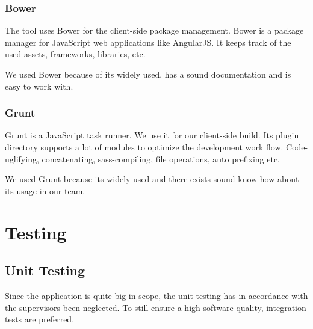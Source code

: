 \subsubsection{Bower}
The tool uses Bower for the client-side package management. Bower is a package manager for JavaScript web applications like AngularJS. It keeps track of the used assets, frameworks, libraries, etc. \cite{bower} \par
We used Bower because of its widely used, has a sound documentation and is easy to work with.

\subsubsection{Grunt}
Grunt is a JavaScript task runner. We use it for our client-side build. Its plugin directory supports a lot of modules to optimize the development work flow. Code-uglifying, concatenating, sass-compiling, file operations, auto prefixing etc. \cite{grunt} \par
We used Grunt because its widely used and there exists sound know how about its usage in our team.



\section{Testing}

\subsection{Unit Testing}
Since the application is quite big in scope, the unit testing has in accordance with the supervisors been neglected. To still ensure a high software quality, integration tests are preferred.

